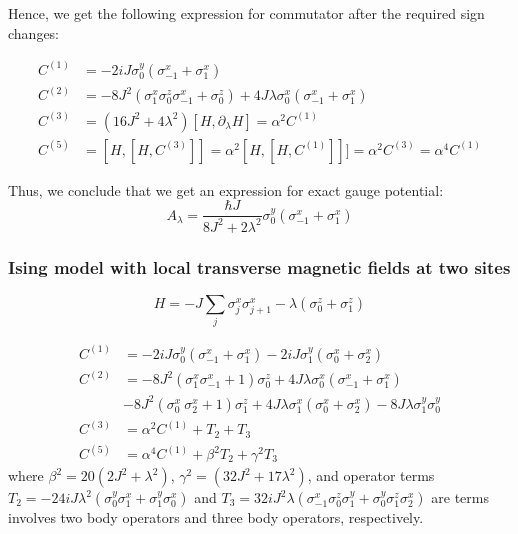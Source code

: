 \documentclass[11pt,a4paper]{article}
\begin{document}
Hence, we get the following  expression for commutator after the required sign changes:


\begin{align*}
C^{(1)}&= -2 i J \sigma_0^y ( \sigma_{-1}^x + \sigma_1^x) \\ 
C^{(2)}&= - 8 J^2(\sigma^x_1 \sigma^z_0 \sigma^x_{-1} + \sigma^z_0) + 4J \lambda \sigma_0^x( \sigma_{-1}^x + \sigma_1^x) \\
C^{(3)} &=  (16 J^2 + 4 \lambda ^2) [H, \partial_{\lambda} H] = \alpha^2  C^{(1)} \\
C^{(5)}&=[H,[H, C^{(3)}]]  = \alpha^2 [H, [H,C^{(1)}]]]=\alpha^2 C^{(3)}=  \alpha^4 C^{(1)}   
\end{align*}

Thus, we conclude that we get an expression for exact gauge potential:
\begin{equation}
\boxed{ A_{\lambda} = \dfrac{\hbar J}{{8 J^2 + 2 \lambda ^2 }} \sigma_0^y ( \sigma_{-1}^x + \sigma_1^x)}
\end{equation}

\subsubsection{Ising model with local transverse magnetic fields at two sites}


\begin{equation}
H= -J \sum_{j}  \sigma_j^x \sigma_{j+1}^x -  \lambda  (\sigma_0^z+ \sigma_1^z) 
\label{xx}
\end{equation}

\begin{align*}
C^{(1)}&= -2 i J \sigma_0^y ( \sigma_{-1}^x + \sigma_1^x)  -2 i J \sigma_1^y ( \sigma_{0}^x + \sigma_2^x) \\ 
C^{(2)}&= - 8 J^2(\sigma^x_1 \sigma^x_{-1} +1) \sigma^z_0 + 4J \lambda \sigma_0^x( \sigma_{-1}^x + \sigma_1^x) \\
& - 8 J^2(\sigma^x_0 \ \sigma^x_{2}+1)  \sigma^z_1 + 4J \lambda \sigma_1^x( \sigma_{0}^x + \sigma_2^x)- 8 J \lambda \sigma_1^y \sigma_0^y\\
C^{(3)} &=   \alpha^2  C^{(1)}  +T_2  +T_3\\  %
C^{(5)} &= \alpha^4  C^{(1)}  + \beta^2 T_2  + \gamma^2 T_3
\end{align*}
where $\beta^2=20 (2 J^2+ \lambda^2)$,   $\gamma^2=(32 J^2+ 17\lambda^2)$, and operator terms $T_2=-24 i J \lambda^2 (\sigma^y_{0} \sigma^x_1+ \sigma^y_{1} \sigma^x_0)$  and $T_3= 32i J^2 \lambda (\sigma^x_{-1} \sigma^z_0 \sigma^y_1   + \sigma^y_{0} \sigma^z_1 \sigma^x_2)$ are  terms involves two body operators and three body operators, respectively.
\end{document}
